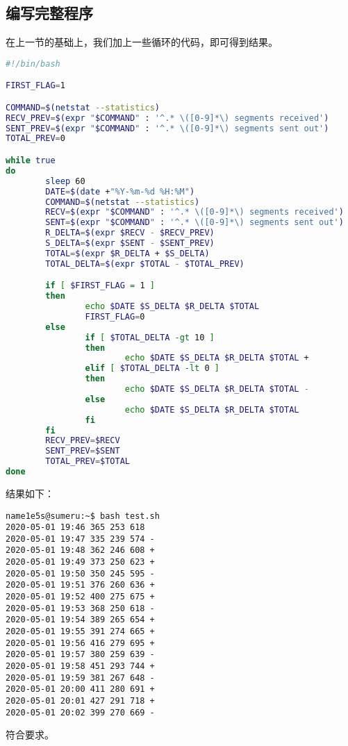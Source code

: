 \documentclass[blue,normal,cn]{elegantnote}
\begin{document}
\subsection{编写完整程序}
在上一节的基础上，我们加上一些循环的代码，即可得到结果。

\begin{lstlisting}[language=bash]
#!/bin/bash

FIRST_FLAG=1

COMMAND=$(netstat --statistics)
RECV_PREV=$(expr "$COMMAND" : '^.* \([0-9]*\) segments received')
SENT_PREV=$(expr "$COMMAND" : '^.* \([0-9]*\) segments sent out')
TOTAL_PREV=0

while true
do
        sleep 60
        DATE=$(date +"%Y-%m-%d %H:%M")
        COMMAND=$(netstat --statistics)
        RECV=$(expr "$COMMAND" : '^.* \([0-9]*\) segments received')
        SENT=$(expr "$COMMAND" : '^.* \([0-9]*\) segments sent out')
        R_DELTA=$(expr $RECV - $RECV_PREV)
        S_DELTA=$(expr $SENT - $SENT_PREV)
        TOTAL=$(expr $R_DELTA + $S_DELTA)
        TOTAL_DELTA=$(expr $TOTAL - $TOTAL_PREV)

        if [ $FIRST_FLAG = 1 ]
        then
                echo $DATE $S_DELTA $R_DELTA $TOTAL
                FIRST_FLAG=0
        else
                if [ $TOTAL_DELTA -gt 10 ]
                then
                        echo $DATE $S_DELTA $R_DELTA $TOTAL +
                elif [ $TOTAL_DELTA -lt 0 ]
                then
                        echo $DATE $S_DELTA $R_DELTA $TOTAL -
                else
                        echo $DATE $S_DELTA $R_DELTA $TOTAL
                fi
        fi
        RECV_PREV=$RECV
        SENT_PREV=$SENT
        TOTAL_PREV=$TOTAL
done
\end{lstlisting}

结果如下：

\begin{lstlisting}
name1e5s@sumeru:~$ bash test.sh
2020-05-01 19:46 365 253 618
2020-05-01 19:47 335 239 574 -
2020-05-01 19:48 362 246 608 +
2020-05-01 19:49 373 250 623 +
2020-05-01 19:50 350 245 595 -
2020-05-01 19:51 376 260 636 +
2020-05-01 19:52 400 275 675 +
2020-05-01 19:53 368 250 618 -
2020-05-01 19:54 389 265 654 +
2020-05-01 19:55 391 274 665 +
2020-05-01 19:56 416 279 695 +
2020-05-01 19:57 380 259 639 -
2020-05-01 19:58 451 293 744 +
2020-05-01 19:59 381 267 648 -
2020-05-01 20:00 411 280 691 +
2020-05-01 20:01 427 291 718 +
2020-05-01 20:02 399 270 669 -
\end{lstlisting}

符合要求。
\end{document}
